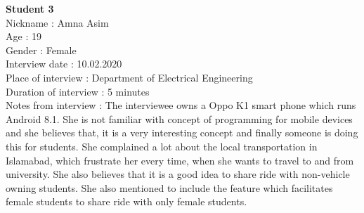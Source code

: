\large{\textbf{Student 3}} 
\\ Nickname : Amna Asim 
\\ Age : 19 
\\ Gender : Female 
\\ Interview date : 10.02.2020 
\\ Place of interview : Department of Electrical Engineering
\\ Duration of interview : 5 minutes 
\\ Notes from interview : The interviewee owns a Oppo K1 smart phone which runs Android 8.1. She is not familiar with concept of programming for mobile devices and she believes that, it is a very interesting concept and finally someone is doing this for students. She complained a lot about the local transportation in Islamabad, which frustrate her every time, when she wants to travel to and from university. She also believes that it is a good idea to share ride with non-vehicle owning students. She also mentioned to include the feature which facilitates female students to share ride with only female students.
 
